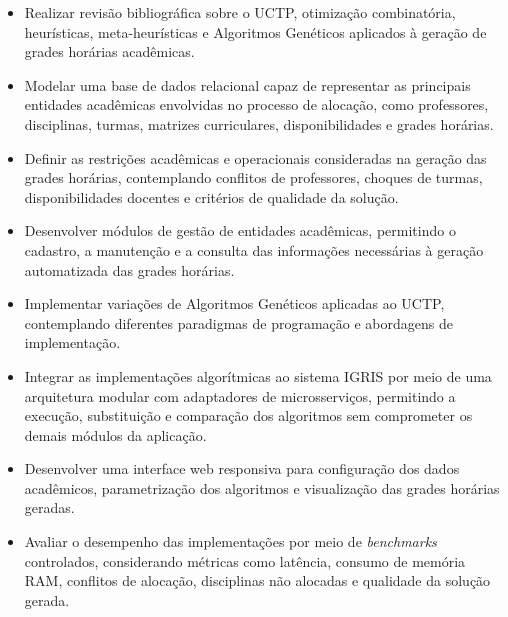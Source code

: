 \begin{itemize}
\item Realizar revisão bibliográfica sobre o UCTP, otimização combinatória, heurísticas, meta-heurísticas e Algoritmos Genéticos aplicados à geração de grades horárias acadêmicas.

\item Modelar uma base de dados relacional capaz de representar as principais entidades acadêmicas envolvidas no processo de alocação, como professores, disciplinas, turmas, matrizes curriculares, disponibilidades e grades horárias.

\item Definir as restrições acadêmicas e operacionais consideradas na geração das grades horárias, contemplando conflitos de professores, choques de turmas, disponibilidades docentes e critérios de qualidade da solução.

\item Desenvolver módulos de gestão de entidades acadêmicas, permitindo o cadastro, a manutenção e a consulta das informações necessárias à geração automatizada das grades horárias.

\item Implementar variações de Algoritmos Genéticos aplicadas ao UCTP, contemplando diferentes paradigmas de programação e abordagens de implementação.

\item Integrar as implementações algorítmicas ao sistema IGRIS por meio de uma arquitetura modular com adaptadores de microsserviços, permitindo a execução, substituição e comparação dos algoritmos sem comprometer os demais módulos da aplicação.

\item Desenvolver uma interface web responsiva para configuração dos dados acadêmicos, parametrização dos algoritmos e visualização das grades horárias geradas.

\item Avaliar o desempenho das implementações por meio de \textit{benchmarks} controlados, considerando métricas como latência, consumo de memória RAM, conflitos de alocação, disciplinas não alocadas e qualidade da solução gerada.
\end{itemize}
